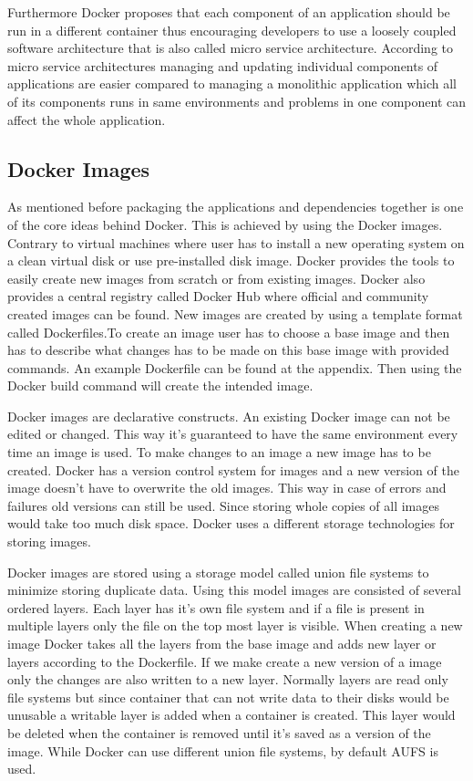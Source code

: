 \documentclass[12pt,oneandhalf,chaparabic,ceng,ms,eng,oneside,pntc]{gsufbe}
\begin{document}
Furthermore Docker proposes that each component of an application should be run in a 
different container thus encouraging developers to use a loosely coupled software architecture that is 
also called micro service architecture. According to micro service architectures managing and updating
individual components of applications are easier compared to managing a monolithic application which
all of its components runs in same environments and problems in one component can affect the whole
application.

\subsection{Docker Images}
As mentioned before packaging the applications and dependencies together is one of the core ideas
behind Docker. This is achieved by using the Docker images. Contrary to virtual machines where user
has to install a new operating system on a clean virtual disk or use pre-installed disk image. Docker 
provides the tools to easily create new images from scratch or from existing images. Docker also
provides a central registry called Docker Hub where official and community created images can be found.
New images are created by using a template format called Dockerfiles.To create an image user has to
choose a base image and then has to describe what changes has to be made on this base image with
provided commands. An example Dockerfile can be found at the appendix. Then using the Docker build
command will create the intended image.

Docker images are declarative constructs. An existing Docker image can not be edited or changed. This
way it's guaranteed to have the same environment every time an image is used. To make changes to an
image a new image has to be created. Docker has a version control system for images and a new version
of the image doesn't have to overwrite the old images. This way in case of errors and failures old
versions can still be used. Since storing whole copies of all images would take too much disk space.
Docker uses a different storage technologies for storing images.

Docker images are stored using a storage model called union file systems to minimize storing duplicate
data. Using this model images are consisted of several ordered layers. Each layer has it's own file
system and if a file is present in multiple layers only the file on the top most layer is visible. When
creating a new image Docker takes all the layers from the base image and adds new layer or layers
according to the Dockerfile. If we make create a new version of a image only the changes are also 
written to a new layer. Normally layers are read only file systems but since container that can not
write data to their disks would be unusable a writable layer is added when a container is created. This
layer would be deleted when the container is removed until it's saved as a version of the image.
While Docker can use different union file systems, by default AUFS is used.
\end{document}
